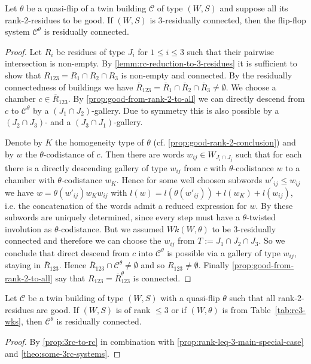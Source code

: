 \begin{prop}
	Let $\theta$ be a quasi-flip of a twin building $\mathcal C$ of type $(W,S)$ and suppose all its rank-2-residues to be good. If $(W,S)$ is 3-residually connected, then the flip-flop system $\mathcal C^\theta$ is residually connected.

	\begin{proof}
		Let $R_i$ be residues of type $J_i$ for $1 \leq i \leq 3$ such that their pairwise intersection is non-empty. By \ref{lemm:rc-reduction-to-3-residues} it is sufficient to show that $R_{123} = R_1 \cap R_2 \cap R_3$ is non-empty and connected. By the residually connectedness of buildings we have $\overline R_{123} = \overline R_1 \cap \overline R_2 \cap \overline R_3 \neq \emptyset$. We choose a chamber $c \in \overline R_{123}$. By \ref{prop:good-from-rank-2-to-all} we can directly descend from $c$ to $\mathcal C^\theta$ by a $(J_1 \cap J_2)$-gallery. Due to symmetry this is also possible by a $(J_2 \cap J_3)$- and a $(J_3 \cap J_1)$-gallery.

		Denote by $K$ the homogeneity type of $\theta$ (cf. \ref{prop:good-rank-2-conclusion}) and by $w$ the $\theta$-codistance of $c$. Then there are words $w_{ij} \in W_{J_i \cap J_j}$ such that for each there is a directly descending gallery of type $w_{ij}$ from $c$ with $\theta$-codistance $w$ to a chamber with $\theta$-codistance $w_K$. Hence for some well choosen subwords $w'_{ij} \leq w_{ij}$ we have $w = \theta(w'_{ij}) w_K w_{ij}$ with $l(w) = l(\theta(w'_{ij})) + l(w_K) + l(w_{ij})$, i.e. the concatenation of the words admit a reduced expression for $w$. By  these subwords are uniquely determined, since every step must have a $\theta$-twisted involution as $\theta$-codistance. But we assumed $Wk(W,\theta)$ to be 3-residually connected and therefore we can choose the $w_{ij}$ from $T := J_1 \cap J_2 \cap J_3$. So we conclude that direct descend from $c$ into $\mathcal C^\theta$ is possible via a gallery of type $w_{ij}$, staying in $\overline R_{123}$. Hence $\overline R_{123} \cap \mathcal C^\theta \neq \emptyset$ and so $R_{123} \neq \emptyset$. Finally \ref{prop:good-from-rank-2-to-all} say that $R_{123} = \overline R_{123}^\theta$ is connected.
	\end{proof}
\end{prop}

\begin{coro}
	Let $\mathcal C$ be a twin building of type $(W,S)$ with a quasi-flip $\theta$ such that all rank-2-residues are good. If $(W,S)$ is of rank $\leq 3$ or if $(W,\theta)$ is from Table~\ref{tab:rc3-wks}, then $\mathcal C^\theta$ is residually connected.

	\begin{proof}
		By \ref{prop:3rc-to-rc} in combination with \ref{prop:rank-leq-3-main-special-case} and \ref{theo:some-3rc-systems}.
	\end{proof}
\end{coro}